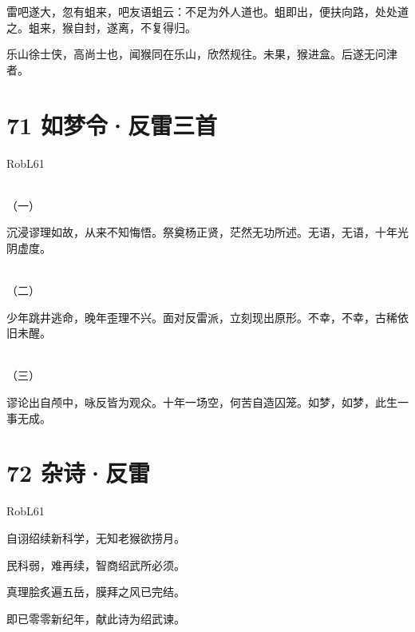 \documentclass[UTF8,12pt,oneside]{ctexbook}
\begin{document}
        雷吧遂大，忽有蛆来，吧友语蛆云：不足为外人道也。蛆即出，便扶向路，处处道之。蛆来，猴自封，遂离，不复得归。
        
        乐山徐士侠，高尚士也，闻猴同在乐山，欣然规往。未果，猴进盒。后遂无问津者。
        
        \section{71 如梦令·反雷三首}
        \begin{center}
        RobL61
        
        ~\\
        \Large \kaishu
        （一）
        \songti \large
        \end{center}
        
        沉浸谬理如故，从来不知悔悟。祭奠杨正贤，茫然无功所述。无语，无语，十年光阴虚度。
        
        \begin{center}
        ~\\
        \Large \kaishu
        （二）
        \songti \large
        \end{center}
        
        少年跳井逃命，晚年歪理不兴。面对反雷派，立刻现出原形。不幸，不幸，古稀依旧未醒。
        
        \begin{center}
        ~\\
        \Large \kaishu
        （三）
        \songti \large
        \end{center}
        
        谬论出自颅中，咏反皆为观众。十年一场空，何苦自造囚笼。如梦，如梦，此生一事无成。
        
        \newpage
        
        \section{72 杂诗·反雷}
        \begin{center}
            RobL61
        \end{center}
        
        \begin{center}
            自诩绍续新科学，无知老猴欲捞月。
            
            民科弱，难再续，智商绍武所必须。
            
            真理脍炙遍五岳，膜拜之风已完结。
            
            即已零零新纪年，献此诗为绍武谏。
        \end{center}
        
\end{document}
